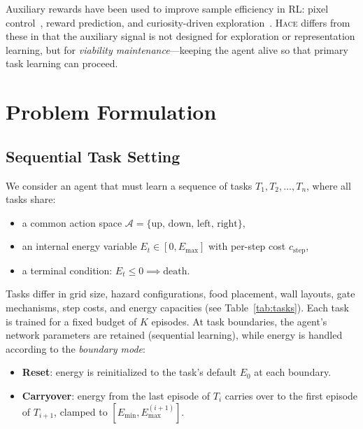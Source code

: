 \documentclass{article}
\newcommand{\energy}{E}
\newcommand{\hace}{\textsc{Hace}}
\begin{document}
Auxiliary rewards have been used to improve sample efficiency in RL:
pixel control~\citep{jaderberg2017}, reward prediction, and curiosity-driven
exploration~\citep{pathak2017}. \hace{} differs from these in that the
auxiliary signal is not designed for exploration or representation learning,
but for \emph{viability maintenance}---keeping the agent alive so that
primary task learning can proceed.

\section{Problem Formulation}
\label{sec:problem}

\subsection{Sequential Task Setting}

We consider an agent that must learn a sequence of tasks
$T_1, T_2, \ldots, T_n$, where all tasks share:
\begin{itemize}[leftmargin=*,topsep=1pt,itemsep=1pt]
  \item a common action space $\mathcal{A} = \{\text{up, down, left, right}\}$,
  \item an internal energy variable $\energy_t \in [0, \energy_{\max}]$ with
        per-step cost $c_{\text{step}}$,
  \item a terminal condition: $\energy_t \leq 0 \implies \text{death}$.
\end{itemize}

Tasks differ in grid size, hazard configurations, food placement, wall
layouts, gate mechanisms, step costs, and energy capacities (see
Table~\ref{tab:tasks}). Each task is trained for a fixed budget of
$K$ episodes. At task boundaries, the agent's network parameters are
retained (sequential learning), while energy is handled according to
the \emph{boundary mode}:

\begin{itemize}[leftmargin=*,topsep=1pt,itemsep=1pt]
  \item \textbf{Reset}: energy is reinitialized to the task's default
        $\energy_0$ at each boundary.
  \item \textbf{Carryover}: energy from the last episode of $T_i$
        carries over to the first episode of $T_{i+1}$, clamped to
        $[\energy_{\min}, \energy_{\max}^{(i+1)}]$.
\end{itemize}
\end{document}
